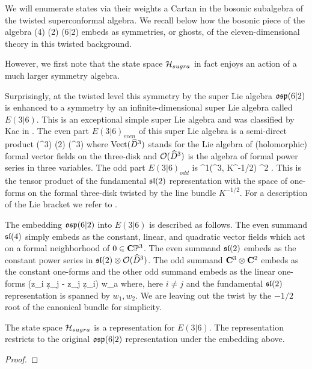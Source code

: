 We will enumerate states via their weights a Cartan in the bosonic subalgebra of the twisted superconformal algebra.
We recall below how the bosonic piece of the algebra
\beqn
\label{eqn:gut}
(4) \times {}(2) \subset {}(6|2) 
\eeqn
embeds as symmetries, or ghosts, of the eleven-dimensional theory in this twisted background.

However, we first note that the state space $\mathcal H_{sugra}$ in fact enjoys an action of a much larger symmetry algebra.

\parsec
Surprisingly, at the twisted level this symmetry by the super Lie algebra $\mathfrak{osp}(6|2)$ is enhanced to a symmetry by an infinite-dimensional super Lie algebra called $E(3|6)$. 
This is an exceptional simple super Lie algebra and was classified by Kac in \cite{KacClass}. 
The even part $E(3|6)_{even}$ of this super Lie algebra is a semi-direct product 
\beqn\label{eqn:evenE36}
\Vect(^3) \oplus {}(2) \otimes \cO(^3) 
\eeqn
where $\operatorname{Vect}(\widehat{D}^3)$ stands for the Lie algebra of (holomorphic) formal vector fields on the three-disk and $\mathcal O(\widehat{D}^3)$ is the algebra of formal power series in three variables.
The odd part $E(3|6)_{odd}$ is 
\beqn\label{eqn:oddE36}
\Omega^{1}(^3, K^{-1/2}) \otimes \C^2  .
\eeqn
This is the tensor product of the fundamental $\mathfrak{sl}(2)$ representation with the space of one-forms on the formal three-disk twisted by the line bundle $K^{-1/2}$.
For a description of the Lie bracket we refer to \cite{KacClass}.

The embedding $\mathfrak{osp}(6|2)$ into $E(3|6)$ is described as follows.
The even summand $\mathfrak{sl}(4)$ simply embeds as the constant, linear, and quadratic vector fields which act on a formal neighborhood of $0 \in \mathbf{C}\mathbb{P}^3$.
The even summand $\mathfrak{sl}(2)$ embeds as the constant power series in $\mathfrak{sl}(2) \otimes \mathcal O(\widehat{D}^3)$. 
The odd summand $\mathbf{C}^3 \otimes \mathbf{C}^2$ embeds as the constant one-forms and the other odd summand embeds as the linear one-forms 
\beqn
{} (z_i \d z_j - z_j \d z_i) \otimes w_a
\eeqn
where, here $i \ne j$ and the fundamental $\mathfrak{sl}(2)$ representation is spanned by $w_1,w_2$.
We are leaving out the twist by the $-1/2$ root of the canonical bundle for simplicity.

\begin{prop}
The state space $\mathcal H_{sugra}$ is a representation for $E(3|6)$.
The representation restricts to the original $\mathfrak{osp}(6|2)$ representation under the embedding above.
\end{prop}
\begin{proof}
\end{proof}

